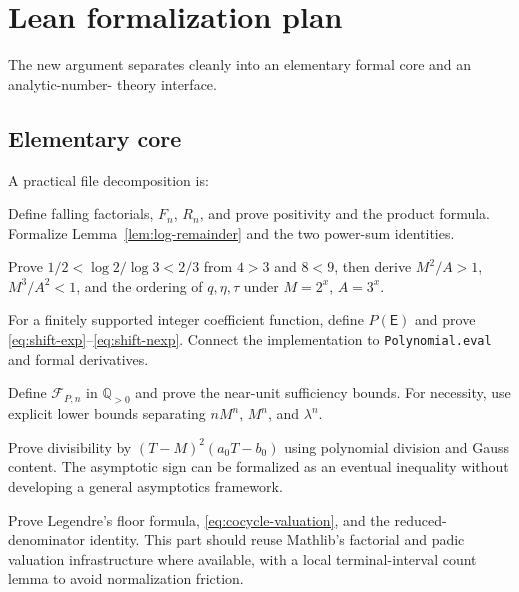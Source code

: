 \documentclass[11pt,oneside]{article}
\theoremstyle{definition}
\theoremstyle{remark}
\newcommand{\Q}{\mathbb Q}
\newcommand{\EF}{\mathsf E}
\newcommand{\cF}{\mathcal F}
\begin{document}
\section{Lean formalization plan}
\label{sec:lean}

The new argument separates cleanly into an elementary formal core and an analytic-number-
theory interface.

\subsection{Elementary core}

A practical file decomposition is:

\begin{description}[leftmargin=3.4cm,style=nextline]
\item[\texttt{BirthdayProduct.lean}]
Define falling factorials, $F_n$, $R_n$, and prove positivity and the product formula.
Formalize Lemma~\ref{lem:log-remainder} and the two power-sum identities.

\item[\texttt{MesoscopicBounds.lean}]
Prove $1/2<\log2/\log3<2/3$ from $4>3$ and $8<9$, then derive
$M^2/A>1$, $M^3/A^2<1$, and the ordering of $q,\eta,\tau$ under
$M=2^x$, $A=3^x$.

\item[\texttt{ShiftPolynomial.lean}]
For a finitely supported integer coefficient function, define $P(\EF)$ and prove
\eqref{eq:shift-exp}--\eqref{eq:shift-nexp}.  Connect the implementation to
\texttt{Polynomial.eval} and formal derivatives.

\item[\texttt{FactorialCocycle.lean}]
Define $\cF_{P,n}$ in $\Q_{>0}$ and prove the near-unit sufficiency bounds.
For necessity, use explicit lower bounds separating $nM^n$, $M^n$, and $\lambda^n$.

\item[\texttt{MinimalAnnihilator.lean}]
Prove divisibility by $(T-M)^2(a_0T-b_0)$ using polynomial division and Gauss content.
The asymptotic sign can be formalized as an eventual inequality without developing a general
asymptotics framework.

\item[\texttt{FactorialValuation.lean}]
Prove Legendre's floor formula, \eqref{eq:cocycle-valuation}, and the reduced-denominator
identity.  This part should reuse Mathlib's factorial and padic valuation infrastructure where
available, with a local terminal-interval count lemma to avoid normalization friction.
\end{description}
\end{document}
